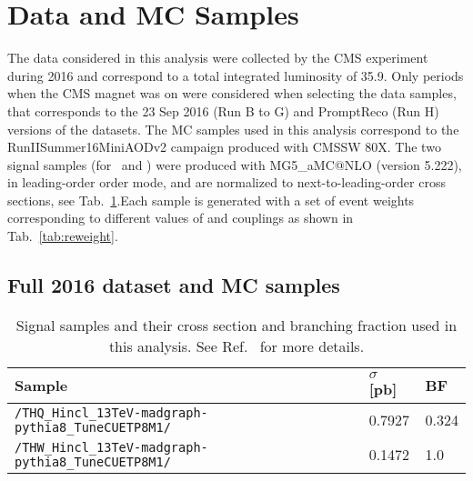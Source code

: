 \section{Data and MC Samples}
\label{secc:samples}

The data considered in this analysis were collected by the CMS experiment during 2016 and correspond to a total integrated luminosity of 35.9\fbinv. Only periods when the CMS magnet was on were considered when selecting the data samples, that corresponds to the 23 Sep 2016 (Run B to G) and PromptReco (Run H) versions of the datasets. The MC samples used in this analysis correspond to the RunIISummer16MiniAODv2 campaign produced with CMSSW 80X. The two signal samples (for \tHq\ and \tHW) were produced with \textsc{MG5\_}a\textsc{MC@NLO} (version 5.222), in leading-order order mode, and are normalized to next-to-leading-order cross sections, see Tab.~\ref{tab:sigsamples}.Each sample is generated with a set of event weights corresponding to different values of \Ct and \CV couplings as shown in Tab.~\ref{tab:reweight}.

\subsection{Full 2016 dataset and MC samples}
\begin{table}[ht!]
\centering \small
\begin{tabular}{lll}
Sample & $\sigma$ [pb] & BF \\ \hline
\verb|/THQ_Hincl_13TeV-madgraph-pythia8_TuneCUETP8M1/| & 0.7927 & 0.324 \\
\verb|/THW_Hincl_13TeV-madgraph-pythia8_TuneCUETP8M1/| & 0.1472 & 1.0   \\\hline
\end{tabular}
\caption[Signal samples and their cross section and branching fraction.]{Signal samples and their cross section and branching fraction used in this analysis. See Ref.~\cite{THQProdTwiki} for more details.}\label{tab:sigsamples}
\end{table}


